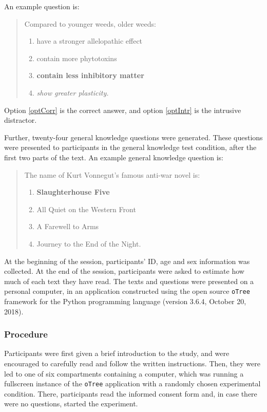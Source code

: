 \documentclass[11pt,]{article}
\begin{document}
An example question is:

\begin{quotation}
\noindent Compared to younger weeds, older weeds:
\begin{enumerate}[label = (\alph*)]
\item have a stronger allelopathic effect
\item contain more phytotoxins
\item \label{optCorr} \textbf{contain less inhibitory matter}
\item \label{optIntr} \textit{show greater plasticity.}
\end{enumerate}
\end{quotation}

Option \ref{optCorr} is the correct answer, and option \ref{optIntr} is
the intrusive distractor.

Further, twenty-four general knowledge questions were generated. These
questions were presented to participants in the general knowledge test
condition, after the first two parts of the text. An example general
knowledge question is:

\begin{quotation}
\noindent The name of Kurt Vonnegut's famous anti-war novel is:
\begin{enumerate}[label = (\alph*)]
\item \textbf{Slaughterhouse Five}
\item All Quiet on the Western Front
\item A Farewell to Arms
\item Journey to the End of the Night.
\end{enumerate}
\end{quotation}

At the beginning of the session, participants' ID, age and sex
information was collected. At the end of the session, participants were
asked to estimate how much of each text they have read. The texts and
questions were presented on a personal computer, in an application
constructed using the open source \texttt{oTree} framework
\citep[version 2.1.35,][]{chenOTreeOpensourcePlatform2016} for the
Python programming language (version 3.6.4, October 20, 2018).

\hypertarget{procedure}{%
\subsubsection{Procedure}\label{procedure}}

Participants were first given a brief introduction to the study, and
were encouraged to carefully read and follow the written instructions.
Then, they were led to one of six compartments containing a computer,
which was running a fullscreen instance of the \texttt{oTree}
application with a randomly chosen experimental condition. There,
participants read the informed consent form and, in case there were no
questions, started the experiment.
\end{document}
